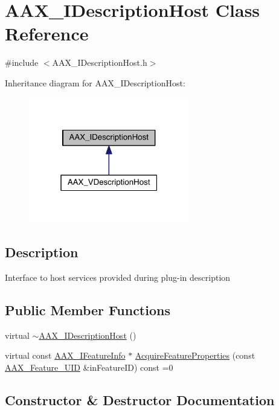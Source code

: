 \hypertarget{a00091}{}\section{A\+A\+X\+\_\+\+I\+Description\+Host Class Reference}
\label{a00091}


{\ttfamily \#include $<$A\+A\+X\+\_\+\+I\+Description\+Host.\+h$>$}



Inheritance diagram for A\+A\+X\+\_\+\+I\+Description\+Host\+:
\nopagebreak
\begin{figure}[H]
\begin{center}
\leavevmode
\includegraphics[width=199pt]{a00611}
\end{center}
\end{figure}


\subsection{Description}
Interface to host services provided during plug-\/in description \subsection*{Public Member Functions}
\begin{DoxyCompactItemize}
\item 
virtual \hyperlink{a00091_a16245728ae5f26a67c2932f2e6a12f26}{$\sim$\+A\+A\+X\+\_\+\+I\+Description\+Host} ()
\item 
virtual const \hyperlink{a00100}{A\+A\+X\+\_\+\+I\+Feature\+Info} $\ast$ \hyperlink{a00091_aa0d9e27d0207113f98c217d870bfa5e9}{Acquire\+Feature\+Properties} (const \hyperlink{a00149_a53d6cf8a08224b3e813333e411ce798e}{A\+A\+X\+\_\+\+Feature\+\_\+\+U\+I\+D} \&in\+Feature\+I\+D) const =0
\end{DoxyCompactItemize}


\subsection{Constructor \& Destructor Documentation}
\hypertarget{a00091_a16245728ae5f26a67c2932f2e6a12f26}{}
